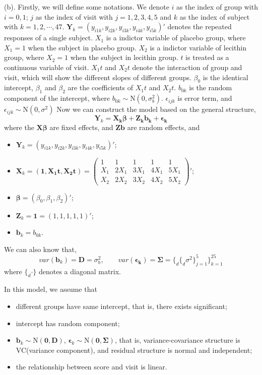 \documentclass[letterpaper, 12pt]{article}
\newcommand{\lma}{\left(\begin{matrix}}
\newcommand{\rma}{\end{matrix}\right)}
\begin{document}
(b). Firstly, we will define some notations. We denote $i$ as the index of group with $i=0,1$; $j$ as the index of visit with $j=1,2,3,4,5$ and $k$ as the index of subject with $k=1,2,\cdots,47$. $\bm{Y}_{k}=(y_{i1k},y_{i2k},y_{i3k},y_{i4k},y_{i5k})'$ denotes the repeated responses of a single subject. $X_1$ is a indictor variable of placebo group, where $X_{1}=1$ when the subject in placebo group. $X_2$ is a indictor variable of lecithin group, where $X_{2}=1$ when the subject in lecithin group. $t$ is treated as a continuous variable of visit. $X_1t$  and $X_2t$ denote the interaction of group and visit, which will show the different slopes of different groups. $\beta_0$ is the identical intercept, $\beta_1$ and $\beta_2$ are the coefficients of $X_1t$  and $X_2t$. $b_{0k}$ is the random component of the intercept, where $b_{0k}\sim \text{N}(0,\sigma_b^2)$. $\epsilon_{ijk}$ is error term, and $\epsilon_{ijk}\sim \text{N}(0,\sigma^2)$ Now we can construct the model based on the general structure,
$$
\bm{Y}_k=\bm{X_k\beta+Z_kb_k+\epsilon_k}
$$
where the $\bm{X\beta}$ are fixed effects, and $\bm{Zb}$ are random effects, and 
\begin{itemize}
\item $\bm{Y}_k=(y_{i1k},y_{i2k},y_{i3k},y_{i4k},y_{i5k})'$;
\item $\bm{X}_k=(\bm{1},\bm{X_1t},\bm{X_2t})=\lma
1&1&1&1&1\\
X_{1}&2X_{1}&3X_{1}&4X_{1}&5X_{1}\\
X_{2}&2X_{2}&3X_{2}&4X_{2}&5X_{2}\rma'$;
\item $\bm{\beta}=(\beta_0,\beta_1,\beta_2)'$;
\item $\bm{Z}_k=\bm{1}=(1,1,1,1,1)'$;
\item $\bm{b}_k=b_{0k}$.
\end{itemize}
We can also know that,
$$
var(\bm{b}_k)=\bm{D}=\sigma_b^2,\qquad var(\bm{\epsilon_k})=\bm{\Sigma}=\big\{_d\{_d \sigma^2\}_{j=1}^5\big\}_{k=1}^{25}
$$
where $\{_d \cdot\}$ denotes a diagonal matrix.

In this model, we assume that
\begin{itemize}
\item different groups have same intercept, that is, there exists significant;
\item intercept has random component;
\item $\bm{b}_k\sim\text{N}(\bm{0},\bm{D})$, $\bm{\epsilon}_k\sim\text{N}(\bm{0},\bm{\Sigma})$, that is, variance-covariance structure is VC(variance component), and residual structure is normal and independent;
\item the relationship between score and visit is linear.
\end{itemize}
\end{document}
